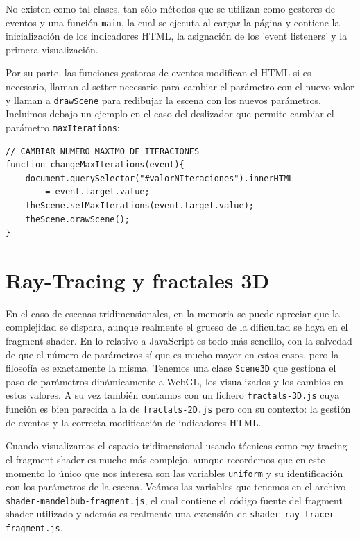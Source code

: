 No existen como tal clases, tan sólo métodos que se utilizan como gestores de eventos y una función \verb|main|, la cual se ejecuta al cargar la página y contiene la inicialización de los indicadores HTML, la asignación de los 'event listeners' y la primera visualización.

Por su parte, las funciones gestoras de eventos modifican el HTML si es necesario, llaman al setter necesario para cambiar el parámetro con el nuevo valor y llaman a \verb|drawScene| para redibujar la escena con los nuevos parámetros. Incluimos debajo un ejemplo en el caso del deslizador que permite cambiar el parámetro \verb|maxIterations|:

\begin{lstlisting}
// CAMBIAR NUMERO MAXIMO DE ITERACIONES
function changeMaxIterations(event){
    document.querySelector("#valorNIteraciones").innerHTML 
        = event.target.value;
    theScene.setMaxIterations(event.target.value);
    theScene.drawScene();
}
\end{lstlisting}

\section{Ray-Tracing y fractales 3D}

En el caso de escenas tridimensionales, en la memoria se puede apreciar que la complejidad se dispara, aunque realmente el grueso de la dificultad se haya en el fragment shader. En lo relativo a JavaScript es todo más sencillo, con la salvedad de que el número de parámetros sí que es mucho mayor en estos casos, pero la filosofía es exactamente la misma. Tenemos una clase \verb|Scene3D| que gestiona el paso de parámetros dinámicamente a WebGL, los visualizados y los cambios en estos valores. A su vez también contamos con un fichero \verb|fractals-3D.js| cuya función es bien parecida a la de \verb|fractals-2D.js| pero con su contexto: la gestión de eventos y la correcta modificación de indicadores HTML.

Cuando visualizamos el espacio tridimensional usando técnicas como ray-tracing el fragment shader es mucho más complejo, aunque recordemos que en este momento lo único que nos interesa son las variables \verb|uniform| y su identificación con los parámetros de la escena. Veámos las variables que tenemos en el archivo \verb|shader-mandelbub-fragment.js|, el cual contiene el código fuente del fragment shader utilizado y además es realmente una extensión de \verb|shader-ray-tracer-fragment.js|.

